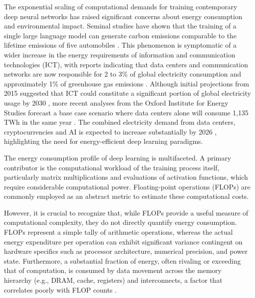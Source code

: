 The exponential scaling of computational demands for training contemporary deep neural networks has raised significant concerns about energy consumption and environmental impact. Seminal studies have shown that the training of a single large language model can generate carbon emissions comparable to the lifetime emissions of five automobiles \cite{strubell2019energy}. This phenomenon is symptomatic of a wider increase in the energy requirements of information and communication technologies (ICT), with reports indicating that data centers and communication networks are now responsible for 2 to 3\% of global electricity consumption and approximately 1\% of greenhouse gas emissions \cite{wef2024growing}. Although initial projections from 2015 suggested that ICT could constitute a significant portion of global electricity usage by 2030 \cite{andrae2015global}, more recent analyses from the Oxford Institute for Energy Studies forecast a base case scenario where data centers alone will consume 1,135 TWh in the same year \cite{oxford2024global}. The combined electricity demand from data centers, cryptocurrencies and AI is expected to increase substantially by 2026 \cite{wef2024growing}, highlighting the need for energy-efficient deep learning paradigms.

The energy consumption profile of deep learning is multifaceted. A primary contributor is the computational workload of the training process itself, particularly matrix multiplications and evaluations of activation functions, which require considerable computational power. Floating-point operations (FLOPs) are commonly employed as an abstract metric to estimate these computational costs.

However, it is crucial to recognize that, while FLOPs provide a useful measure of computational complexity, they do not directly quantify energy consumption. FLOPs represent a simple tally of arithmetic operations, whereas the actual energy expenditure per operation can exhibit significant variance contingent on hardware specifics such as processor architecture, numerical precision, and power state. Furthermore, a substantial fraction of energy, often rivaling or exceeding that of computation, is consumed by data movement across the memory hierarchy (e.g., DRAM, cache, registers) and interconnects, a factor that correlates poorly with FLOP counts \cite{horowitz2014computing}.

